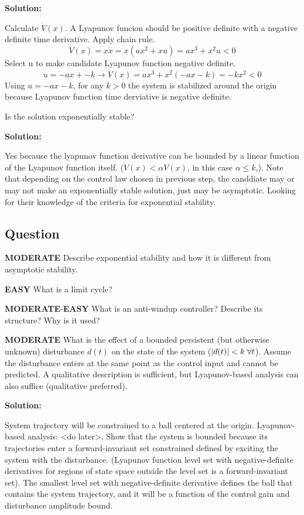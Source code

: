 \documentclass{article}
\newenvironment{Solution}{
\begin{tcolorbox}
\color{purple}
\textbf{Solution:}
}
{
\end{tcolorbox}
\ignorespacesafterend
}
\newcommand{\RatingBase}[2]{\textcolor{#1}{{\fontfamily{phv}\selectfont\textbf{#2}}}}
\newcommand{\Easy}{\RatingBase{green!50!black!50}{EASY}}
\newcommand{\Moderate}{\RatingBase{yellow!50!black!50}{MODERATE}}
\begin{document}
\begin{Solution}
Calculate $\dot{V}(x)$.  A Lyapunov funcion should be positive definite with a negative definite time derivative.  Apply chain rule.
\begin{equation}
\dot{V}(x)=x\dot{x}=x(ax^2+xu) =ax^3+x^2u< 0
\end{equation}
Select u to make candidate Lyapunov function negative definite.
\begin{equation}
 u=-ax + -k  \rightarrow \dot{V}(x)=ax^3+x^2(-ax-k)=-kx^2<0
\end{equation}
Using $u=-ax-k$, for any $k>0$ the system is stabilized around the origin because Lyapunov function time derviative is negative definite.
\end{Solution}
Is the solution exponentially stable?
\begin{Solution}
Yes  because the lyapunov function derivative can be bounded by a linear function of the Lyapunov function itself.  ($\dot{V}(x) < \alpha V(x)$, in this case $\alpha \le k$,).  Note that depending on the control law chosen in previous step, the canddiate may or may not make an exponentially stable solution, just may be asymptotic.  Looking for their knowledge of the criteria for exponential stability.
\end{Solution}


\subsection{Question}
\Moderate{} Describe exponential stability and how it is different from asymptotic stability.

\Easy{} What is a limit cycle?

\Moderate{}-\Easy{} What is an anti-windup controller?  Describe its structure?  Why is it used?

\Moderate{} What is the effect of a bounded persistent (but otherwise unknown) disturbance $d(t)$ on the state of the system ($|d(t)| < k \hspace{1mm}\forall t$).  Assume the disturbance enters at the same point as the control input and cannot be predicted.  A qualitative description is sufficient, but Lyapunov-based analysis can also suffice (qualitative preferred).
\begin{Solution}
System trajectory will be constrained to a ball centered at the origin.
\vskip 2mm
Lyapunov-based analysis:
<do later>, Show that the system is bounded because its trajectories enter a forward-invariant set constrained defined by exciting the system with the disturbance.  (Lyapunov function level set with negative-definite derivatives for regions of state space outside the level set is a forward-invariant set).  The smallest level set with negative-definite derivative defines the ball that contains the system trajectory, and it will be a function of the control gain and disturbance amplitude bound.
\end{Solution}
\end{document}
